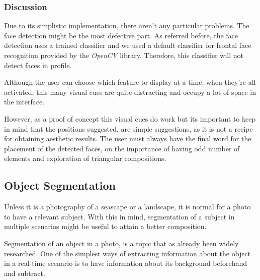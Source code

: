 \subsubsection{Discussion}

Due to its simplistic implementation, there aren't any particular problems. The face detection might be the most defective part. As referred before, the face detection uses a trained classifier and we used a default classifier for frontal face recognition provided by the \emph{OpenCV} library. Therefore, this classifier will not detect faces in profile.

Although the user can choose which feature to display at a time, when they're all activated, this many visual cues are quite distracting and occupy a lot of space in the interface.

However, as a proof of concept this visual cues do work but its important to keep in mind that the positions suggested, are simple suggestions, as it is not a recipe for obtaining aesthetic results. The user must always have the final word for the placement of the detected faces, on the importance of having odd number of elements and exploration of triangular compositions.

\subsection{Object Segmentation}
\label{sub:segmentation}

Unless it is a photography of a seascape or a landscape, it is normal for a photo to have a relevant subject. With this in mind, segmentation of a subject in multiple scenarios might be useful to attain a better composition.

Segmentation of an object in a photo, is a topic that as already been widely researched. One of the simplest ways of extracting information about the object in a real-time scenario is to have information about its background beforehand and subtract. 

